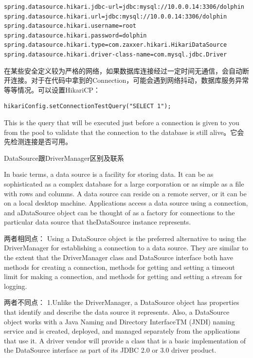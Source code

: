 \documentclass[12pt]{book}
\makeatletter
\numberwithin{dummy}{section}
\theoremstyle{ocrenumbox}
\theoremstyle{blacknumex}
\theoremstyle{blacknumbox}
\theoremstyle{ocrenum}
\renewcommand\paragraph{\@startsection{paragraph}{4}{\z@}
	{-2ex \@plus-.2ex \@minus .2ex}
	{.1ex}
	{\normalfont\small\sffamily\bfseries}}
\makeatother
\begin{document}
\begin{lstlisting}
spring.datasource.hikari.jdbc-url=jdbc:mysql://10.0.0.14:3306/dolphin
spring.datasource.hikari.url=jdbc:mysql://10.0.0.14:3306/dolphin
spring.datasource.hikari.username=root
spring.datasource.hikari.password=dolphin
spring.datasource.hikari.type=com.zaxxer.hikari.HikariDataSource
spring.datasource.hikari.driver-class-name=com.mysql.jdbc.Driver
\end{lstlisting}

在某些安全定义较为严格的网络，如果数据库连接经过一定时间无通信，会自动断开连接。对于在代码中拿到的Connection，可能会遇到网络抖动，数据库服务异常等等情况。可以设置HikariCP：

\begin{lstlisting}
hikariConfig.setConnectionTestQuery("SELECT 1");
\end{lstlisting}
        
This is the query that will be executed just before a connection is given to you from the pool to validate that the connection to the database is still alive。它会先检测连接是否可用。


\paragraph{DataSource跟DriverManager区别及联系}

In basic terms, a data source is a facility for storing data. It can be as sophisticated as a complex database for a large corporation or as simple as a file with rows and columns. A data source can reside on a remote server, or it can be on a local desktop machine. Applications access a data source using a connection, and aDataSource object can be thought of as a factory for connections to the particular data source that theDataSource instance represents.

两者相同点：
Using a DataSource object is the preferred alternative to using the DriverManager for establishing a connection to a data source. They are similar to the extent that the DriverManager class and DataSource interface both have methods for creating a connection, methods for getting and setting a timeout limit for making a connection, and methods for getting and setting a stream for logging.

两者不同点：
1.Unlike the DriverManager, a DataSource object has properties that identify and describe the data source it represents. Also, a DataSource object works with a Java Naming and Directory InterfaceTM (JNDI) naming service and is created, deployed, and managed separately from the applications that use it. A driver vendor will provide a class that is a basic implementation of the DataSource interface as part of its JDBC 2.0 or 3.0 driver product.
\end{document}
